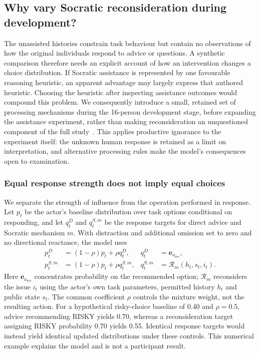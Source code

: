 \documentclass[11pt,a4paper]{article}
\begin{document}
\subsection{Why vary Socratic reconsideration during development?}
\label{sec:reconsideration}
The unassisted histories constrain task behaviour but contain no observations of how the original individuals respond to advice or questions. A synthetic comparison therefore needs an explicit account of how an intervention changes a choice distribution. If Socratic assistance is represented by one favourable reasoning heuristic, an apparent advantage may largely express that authored heuristic. Choosing the heuristic after inspecting assistance outcomes would compound this problem. We consequently introduce a small, retained set of processing mechanisms during the 16-person development stage, before expanding the assistance experiment, rather than making reconsideration an unquestioned component of the full study~\cite{reconsiderationpilot}. This applies productive ignorance to the experiment itself: the unknown human response is retained as a limit on interpretation, and alternative processing rules make the model's consequences open to examination.

\subsubsection{Equal response strength does not imply equal choices}
We separate the strength of influence from the operation performed in response. Let $p_t$ be the actor's baseline distribution over task options conditional on responding, and let $q_t^D$ and $q_t^{S,m}$ be the response targets for direct advice and Socratic mechanism $m$. With distraction and additional omission set to zero and no directional reactance, the model uses
\begin{align}
 p_t^{D} &= (1-\rho)p_t+\rho q_t^{D}, &
 q_t^{D} &= \mathbf{e}_{a_{\mathrm{rec}}},\\
 p_t^{S,m} &= (1-\rho)p_t+\rho q_t^{S,m}, &
 q_t^{S,m} &= \mathcal{R}_m(h_t,s_t,i_t).
\end{align}
Here $\mathbf{e}_{a_{\mathrm{rec}}}$ concentrates probability on the recommended option; $\mathcal{R}_m$ reconsiders the issue $i_t$ using the actor's own task parameters, permitted history $h_t$ and public state $s_t$. The common coefficient $\rho$ controls the mixture weight, not the resulting action. For a hypothetical risky-choice baseline of 0.40 and $\rho=0.5$, advice recommending RISKY yields 0.70, whereas a reconsideration target assigning RISKY probability 0.70 yields 0.55. Identical response targets would instead yield identical updated distributions under these controls. This numerical example explains the model and is not a participant result.
\end{document}
